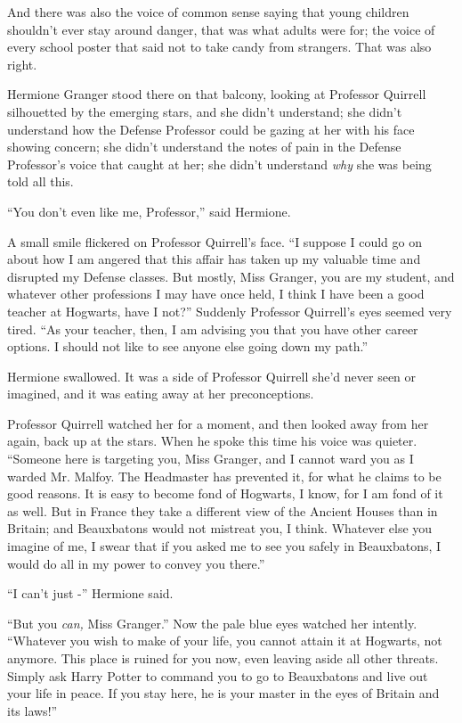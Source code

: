 And there was also the voice of common sense saying that young children
shouldn't ever stay around danger, that was what adults were for; the
voice of every school poster that said not to take candy from strangers.
That was also right.

Hermione Granger stood there on that balcony, looking at Professor
Quirrell silhouetted by the emerging stars, and she didn't understand;
she didn't understand how the Defense Professor could be gazing at her
with his face showing concern; she didn't understand the notes of pain
in the Defense Professor's voice that caught at her; she didn't
understand \emph{why} she was being told all this.

``You don't even like me, Professor,'' said Hermione.

A small smile flickered on Professor Quirrell's face. ``I suppose I
could go on about how I am angered that this affair has taken up my
valuable time and disrupted my Defense classes. But mostly, Miss
Granger, you are my student, and whatever other professions I may have
once held, I think I have been a good teacher at Hogwarts, have I not?''
Suddenly Professor Quirrell's eyes seemed very tired. ``As your teacher,
then, I am advising you that you have other career options. I should not
like to see anyone else going down my path.''

Hermione swallowed. It was a side of Professor Quirrell she'd never seen
or imagined, and it was eating away at her preconceptions.

Professor Quirrell watched her for a moment, and then looked away from
her again, back up at the stars. When he spoke this time his voice was
quieter. ``Someone here is targeting you, Miss Granger, and I cannot
ward you as I warded Mr. Malfoy. The Headmaster has prevented it, for
what he claims to be good reasons. It is easy to become fond of
Hogwarts, I know, for I am fond of it as well. But in France they take a
different view of the Ancient Houses than in Britain; and Beauxbatons
would not mistreat you, I think. Whatever else you imagine of me, I
swear that if you asked me to see you safely in Beauxbatons, I would do
all in my power to convey you there.''

``I can't just -'' Hermione said.

``But you \emph{can,} Miss Granger.'' Now the pale blue eyes watched her
intently. ``Whatever you wish to make of your life, you cannot attain it
at Hogwarts, not anymore. This place is ruined for you now, even leaving
aside all other threats. Simply ask Harry Potter to command you to go to
Beauxbatons and live out your life in peace. If you stay here, he is
your master in the eyes of Britain and its laws!''

